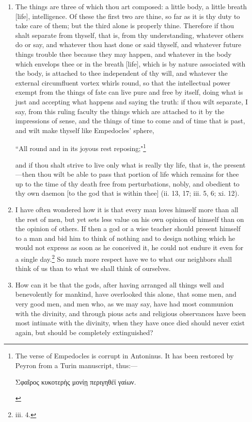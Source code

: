 \begin{enumerate}
\item The things are three of which thou art composed: a little body, a little breath [{\clarify life}], intelligence. Of these the first two are thine, so far as it is thy duty to take care of them; but the third alone is properly thine. Therefore if thou shalt separate from thyself, that is, from thy understanding, whatever others do or say, and whatever thou hast done or said thyself, and whatever future things trouble thee because they may happen, and whatever in the body which envelops thee or in the breath [{\clarify life}], which is by nature associated with the body, is attached to thee independent of thy will, and whatever the external circumfluent vortex whirls round, so that the intellectual power exempt from the things of fate can live pure and free by itself, doing what is just and accepting what happens and saying the truth: if thou wilt separate, I say, from this ruling faculty the things which are attached to it by the impressions of sense, and the things of time to come and of time that is past, and wilt make thyself like Empedocles' sphere,
\begin{displayquote}
	``All round and in its joyous rest reposing;"\footnote{The verse of Empedocles is corrupt in Antoninus. It has been restored by Peyron from a Turin manuscript, thus:—
\begin{displayquote}
	\textgreek{Σφαῖρος κυκοτερὴς μονίῃ περιγηθέϊ γαίων}.
\end{displayquote}
}
\end{displayquote}
and if thou shalt strive to live only what is really thy life, that is, the present—then thou wilt be able to pass that portion of life which remains for thee up to the time of thy death free from perturbations, nobly, and obedient to thy own daemon [{\clarify to the god that is within thee}] (ii. 13, 17; iii. 5, 6; xi. 12).

\item I have often wondered how it is that every man loves himself more than all the rest of men, but yet sets less value on his own opinion of himself than on the opinion of others. If then a god or a wise teacher should present himself to a man and bid him to think of nothing and to design nothing which he would not express as soon as he conceived it, he could not endure it even for a single day.\footnote{iii. 4.} So much more respect have we to what our neighbors shall think of us than to what we shall think of ourselves.

\item How can it be that the gods, after having arranged all things well and benevolently for mankind, have overlooked this alone, that some men, and very good men, and men who, as we may say, have had most communion with the divinity, and through pious acts and religious observances have been most intimate with the divinity, when they have once died should never exist again, but should be completely extinguished?


\end{enumerate}
